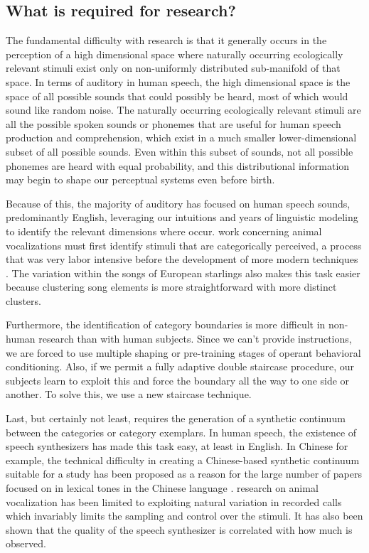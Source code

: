 \subsection{What is required for \CP research?}

The fundamental difficulty with \CP research is that it generally occurs in the perception of a high dimensional space where naturally occurring ecologically relevant stimuli exist only on non-uniformly distributed sub-manifold of that space. In terms of auditory \CP in human speech, the high dimensional space is the space of all possible sounds that could possibly be heard, most of which would sound like random noise. The naturally occurring ecologically relevant stimuli are all the possible spoken sounds or phonemes that are useful for human speech production and comprehension, which exist in a much smaller lower-dimensional subset of all possible sounds. Even within this subset of sounds, not all possible phonemes are heard with equal probability, and this distributional information may begin to shape our perceptual systems even before birth.

Because of this, the majority of auditory \CP has focused on human speech sounds, predominantly English, leveraging our intuitions and years of linguistic modeling to identify the relevant dimensions where \CP occur. \CP work concerning animal vocalizations must first identify stimuli that are categorically perceived, a process that was very labor intensive \cite{nelson1989categorical,prather2009neural,lachlan2015context} before the development of more modern techniques \cite{sainburg2019parallels}. The variation within the songs of European starlings also makes this task easier because clustering song elements is more straightforward with more distinct clusters.

Furthermore, the identification of category boundaries is more difficult in non-human research than with human subjects. Since we can't provide instructions, we are forced to use multiple shaping or pre-training stages of operant behavioral conditioning. Also, if we permit a fully adaptive double staircase procedure, our subjects learn to exploit this and force the boundary all the way to one side or another. To solve this, we use a new staircase technique.

Last, but certainly not least, \CP requires the generation of a synthetic continuum between the categories or category exemplars. In human speech, the existence of speech synthesizers has made this task easy, at least in English. In Chinese for example, the technical difficulty in creating a Chinese-based synthetic continuum suitable for a \CP study has been proposed as a reason for the large number of papers focused on \CP in lexical tones in the Chinese language \cite{zhang2013categorical}. \CP research on animal vocalization has been limited to exploiting natural variation in recorded calls \cite{nelson1989categorical,prather2009neural,lachlan2015context} which invariably limits the sampling and control over the stimuli. It has also been shown that the quality of the speech synthesizer is correlated with how much \CP is observed\cite{van1999categorical}.

